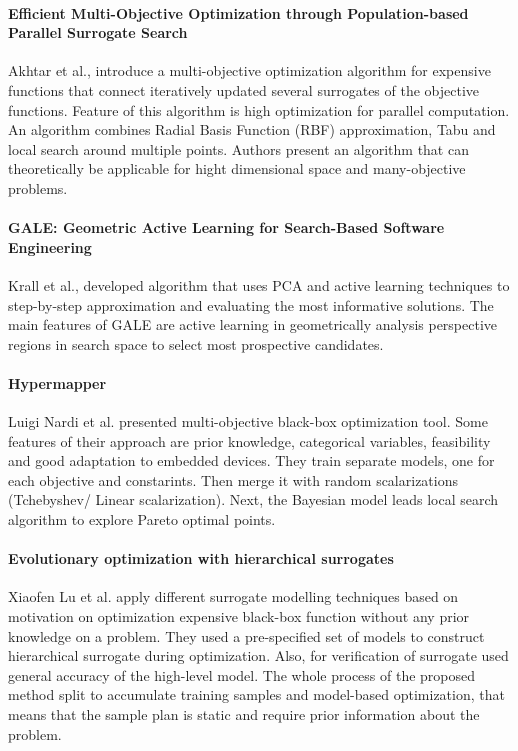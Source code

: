         \paragraph{Efficient Multi-Objective Optimization through Population-based Parallel Surrogate Search} Akhtar et al.,\cite{akhtar2019efficient} introduce a multi-objective optimization algorithm for expensive functions that connect iteratively updated several surrogates of the objective functions. Feature of this algorithm is high optimization for parallel computation. An algorithm combines Radial Basis Function (RBF) approximation, Tabu and local search around multiple points. Authors present an algorithm that can theoretically be applicable for hight dimensional space and many-objective problems.

        \paragraph{GALE: Geometric Active Learning for Search-Based Software Engineering} Krall et al.,\cite{KrallMD15} developed algorithm that uses PCA and active learning techniques to step-by-step approximation and evaluating the most informative solutions. The main features of GALE are active learning in geometrically analysis perspective regions in search space to select most prospective candidates.

        \paragraph{Hypermapper} Luigi Nardi et al. \cite{nardi2019practical} presented multi-objective black-box optimization tool. Some features of their approach are prior knowledge, categorical variables, feasibility and good adaptation to embedded devices. They train separate models, one for each objective and constarints. Then merge it with random scalarizations (Tchebyshev/ Linear scalarization). Next, the Bayesian model leads local search algorithm to explore Pareto optimal points.  

        \paragraph{Evolutionary optimization with hierarchical surrogates} Xiaofen Lu et al. \cite{LuST19} apply different surrogate modelling techniques based on motivation on optimization expensive black-box function without any prior knowledge on a problem. They used a pre-specified set of models to construct hierarchical surrogate during optimization. Also, for verification of surrogate used general accuracy of the high-level model. The whole process of the proposed method split to accumulate training samples and model-based optimization, that means that the sample plan is static and require prior information about the problem.

